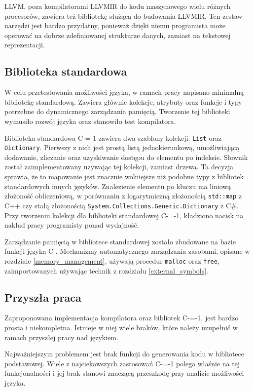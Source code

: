 LLVM, poza kompilatorami LLVMIR do kodu maszynowego wielu różnych procesorów, zawiera też bibliotekę służącą do budowania LLVMIR.
Ten zestaw narzędzi jest bardzo przydatny, ponieważ dzięki niemu programista może operować na dobrze zdefiniowanej strukturze danych, zamiast na tekstowej reprezentacji.

\subsection{Biblioteka standardowa}

W celu przetestowania możliwości języka, w ramach pracy napisano minimalną bibliotekę standardową.
Zawiera głównie kolekcje, atrybuty oraz funkcje i typy potrzebne do dynamicznego zarządzania pamięcią.
Tworzenie tej biblioteki wymusiło rozwój języka oraz stanowiło test kompilatora.

Biblioteka standardowa C-=-1 zawiera dwa szablony kolekcji: \lstinline{List} oraz \lstinline{Dictionary}.
Pierwszy z nich jest prostą listą jednokierunkową, umożliwiającą dodawanie, zliczanie oraz uzyskiwanie dostępu do elementu po indeksie.
Słownik został zaimplementowany używając tej kolekcji, zamiast drzewa.
Ta decyzja sprawia, że to mapowanie jest znacznie wolniejsze niż podobne typy z bibliotek standardowych innych języków.
Znalezienie elementu po kluczu ma liniową złożoność obliczeniową, w porównaniu z logarytmiczną złożonością \lstinline{std::map} z C++ czy stałą złożonością \lstinline{System.Collections.Generic.Dictionary} z C\#.
Przy tworzeniu kolekcji dla biblioteki standardowej C-=-1, kładziono nacisk na nakład pracy programisty ponad wydajność.

Zarządzanie pamięcią w bibliotece standardowej zostało zbudowane na bazie funkcji języka C \cite{cLangStandard}.
Mechanizmy automatycznego zarządzania zasobami, opisane w rozdziale \ref{memory_management}, używają procedur \lstinline{malloc} oraz \lstinline{free}, zaimportowanych używając technik z rozdziału \ref{external_symbols}.

\subsection{Przyszła praca}

Zaproponowana implementacja kompilatora oraz bibliotek C-=-1, jest bardzo prosta i niekompletna.
Istnieje w niej wiele braków, które należy uzupełnić w ramach przyszłej pracy nad językiem.

Najważniejszym problemem jest brak funkcji do generowania kodu w bibliotece podstawowej.
Wiele z najciekawszych zastosowań C-=-1 polega właśnie na tej funkcjonalności i jej brak stanowi znaczącą przeszkodę przy analizie możliwości języka.
